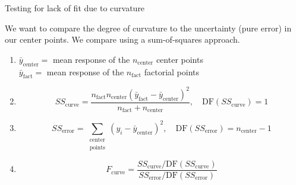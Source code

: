 \documentclass[10pt]{beamer}
\begin{document}
\begin{frame}{Testing for lack of fit due to curvature}

We want to compare the degree of curvature to the uncertainty (pure error) in our center points. We compare using a sum-of-squares approach.

\begin{enumerate}
  \item<2-> $\bar{y}_\text{center} = $ mean response of the $n_\text{center}$ center points\\ 
      $\bar{y}_\text{fact} = $ mean response of the $n_\text{fact}$ factorial points
  \item<3-> \[ SS_\text{curve} = \frac{n_\text{fact}n_\text{center}(\bar{y}_\text{fact} - \bar{y}_\text{center})^2}{n_\text{fact} + n_\text{center}},\quad \text{DF}(SS_\text{curve}) = 1 \]
  \item<4-> \[ SS_\text{error} = \sum_{\substack{\text{center} \\ \text{points}}} (y_i - \bar{y}_\text{center})^2,\quad \text{DF}(SS_\text{error}) = n_\text{center} - 1 \]
  \item<5-> \[ F_\text{curve} = \frac{SS_\text{curve}/\text{DF}(SS_\text{curve})}{SS_\text{error}/\text{DF}(SS_\text{error})} \]
\end{enumerate}

\end{frame}
\end{document}
